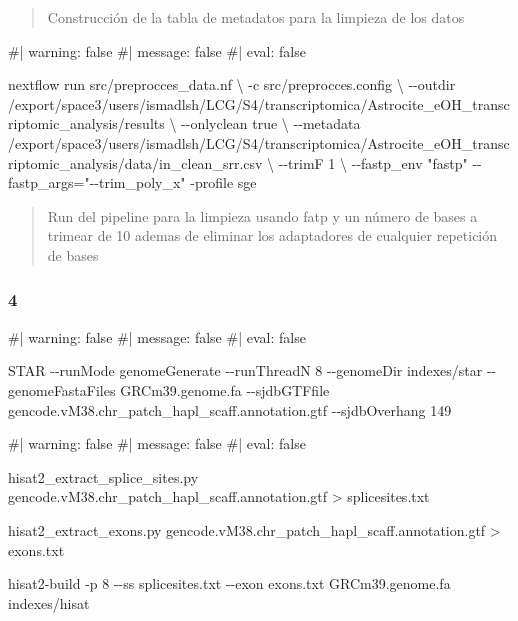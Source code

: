 \documentclass[
  10pt,
]{article}
\newenvironment{Shaded}{\begin{snugshade}}{\end{snugshade}}
\newcommand{\NormalTok}[1]{\textcolor[rgb]{0.00,0.23,0.31}{#1}}
\begin{document}
\begin{quote}
Construcción de la tabla de metadatos para la limpieza de los datos
\end{quote}

\begin{Shaded}
\begin{Highlighting}[]
\NormalTok{\#| warning: false}
\NormalTok{\#| message: false}
\NormalTok{\#| eval: false}

\NormalTok{nextflow run src/preprocces\_data.nf \textbackslash{}}
\NormalTok{    {-}c src/preprocces.config \textbackslash{}}
\NormalTok{    {-}{-}outdir /export/space3/users/ismadlsh/LCG/S4/transcriptomica/Astrocite\_eOH\_transcriptomic\_analysis/results \textbackslash{}}
\NormalTok{    {-}{-}onlyclean true \textbackslash{}}
\NormalTok{    {-}{-}metadata /export/space3/users/ismadlsh/LCG/S4/transcriptomica/Astrocite\_eOH\_transcriptomic\_analysis/data/in\_clean\_srr.csv \textbackslash{}}
\NormalTok{    {-}{-}trimF 1 \textbackslash{}}
\NormalTok{    {-}{-}fastp\_env "fastp" {-}{-}fastp\_args="{-}{-}trim\_poly\_x" {-}profile sge}
\end{Highlighting}
\end{Shaded}

\begin{quote}
Run del pipeline para la limpieza usando fatp y un número de bases a
trimear de 10 ademas de eliminar los adaptadores de cualquier repetición
de bases
\end{quote}

\subsubsection{4}\label{section-3}

\begin{Shaded}
\begin{Highlighting}[]
\NormalTok{\#| warning: false}
\NormalTok{\#| message: false}
\NormalTok{\#| eval: false}

\NormalTok{STAR {-}{-}runMode genomeGenerate {-}{-}runThreadN 8 {-}{-}genomeDir indexes/star {-}{-}genomeFastaFiles GRCm39.genome.fa {-}{-}sjdbGTFfile gencode.vM38.chr\_patch\_hapl\_scaff.annotation.gtf {-}{-}sjdbOverhang 149}
\end{Highlighting}
\end{Shaded}

\begin{Shaded}
\begin{Highlighting}[]
\NormalTok{\#| warning: false}
\NormalTok{\#| message: false}
\NormalTok{\#| eval: false}

\NormalTok{hisat2\_extract\_splice\_sites.py gencode.vM38.chr\_patch\_hapl\_scaff.annotation.gtf \textgreater{} splicesites.txt}

\NormalTok{hisat2\_extract\_exons.py gencode.vM38.chr\_patch\_hapl\_scaff.annotation.gtf \textgreater{} exons.txt}

\NormalTok{hisat2{-}build {-}p 8 {-}{-}ss splicesites.txt {-}{-}exon exons.txt GRCm39.genome.fa indexes/hisat}
\end{Highlighting}
\end{Shaded}
\end{document}
